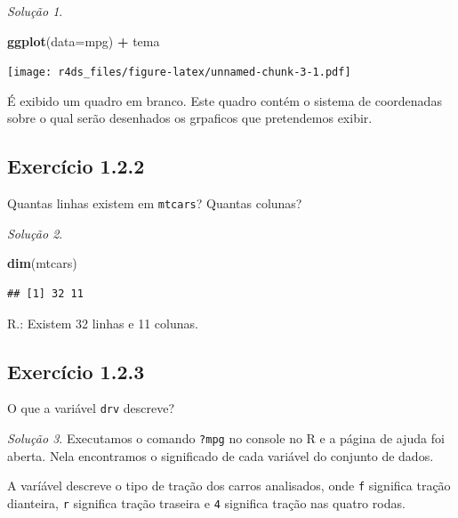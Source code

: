 \documentclass[
]{latex/krantz}
\newenvironment{Shaded}{\begin{snugshade}}{\end{snugshade}}
\newcommand{\AttributeTok}[1]{\textcolor[rgb]{0.13,0.29,0.53}{#1}}
\newcommand{\FunctionTok}[1]{\textcolor[rgb]{0.13,0.29,0.53}{\textbf{#1}}}
\newcommand{\NormalTok}[1]{#1}
\newcommand{\SpecialCharTok}[1]{\textcolor[rgb]{0.81,0.36,0.00}{\textbf{#1}}}
\theoremstyle{definition}
\theoremstyle{definition}
\theoremstyle{definition}
\theoremstyle{definition}
\theoremstyle{remark}
\newtheorem*{solution}{Solução}
\begin{document}
\begin{solution}
\leavevmode

\begin{Shaded}
\begin{Highlighting}[]
\FunctionTok{ggplot}\NormalTok{(}\AttributeTok{data=}\NormalTok{mpg) }\SpecialCharTok{+}
\NormalTok{    tema}
\end{Highlighting}
\end{Shaded}

\texttt{[image: r4ds\_files/figure-latex/unnamed-chunk-3-1.pdf]}

É exibido um quadro em branco. Este quadro contém o sistema de coordenadas sobre o qual serão desenhados os grpaficos que pretendemos exibir.

\end{solution}

\hypertarget{exr1-2-2}{%
\subsection*{Exercício 1.2.2}\label{exr1-2-2}}

Quantas linhas existem em \texttt{mtcars}? Quantas colunas?

\begin{solution}
\leavevmode

\begin{Shaded}
\begin{Highlighting}[]
\FunctionTok{dim}\NormalTok{(mtcars)}
\end{Highlighting}
\end{Shaded}

\begin{verbatim}
## [1] 32 11
\end{verbatim}

R.: Existem 32 linhas e 11 colunas.

\end{solution}

\hypertarget{exr1-2-3}{%
\subsection*{Exercício 1.2.3}\label{exr1-2-3}}

O que a variável \texttt{drv} descreve?

\begin{solution}
Executamos o comando \texttt{?mpg} no console no R e a página de ajuda foi aberta. Nela encontramos o significado de cada variável do conjunto de dados.

A varíável descreve o tipo de tração dos carros analisados, onde \texttt{f} significa tração dianteira, \texttt{r} significa tração traseira e \texttt{4} significa tração nas quatro rodas.
\end{solution}
\end{document}
